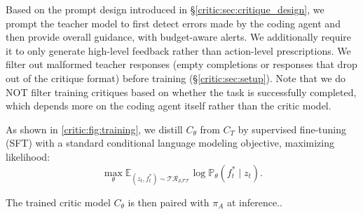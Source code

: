Based on the prompt design introduced in \S\ref{critic:sec:critique_design}, we prompt the teacher model to first detect errors made by the coding agent and then provide overall guidance, with budget-aware alerts. We additionally require it to only generate high-level feedback rather than action-level prescriptions.
We filter out malformed teacher responses (empty completions or responses that drop out of the critique format) before training (\S\ref{critic:sec:setup}).
Note that we do NOT filter training critiques based on whether the task is successfully completed, which depends more on the coding agent itself rather than the critic model.


As shown in \autoref{critic:fig:training}, we distill $C_\theta$ from $C_T$ by supervised fine-tuning (SFT) with a standard conditional language modeling objective, maximizing likelihood:
\begin{equation}
    \max _{\theta} \mathbb{E}_{(z_t, f_t^*) \sim \mathcal{TR_{SFT}}} \log \mathbb{P}_{\theta}(f_t^* \mid z_t).
\label{critic:eq:sft_loss}
\end{equation}

The trained critic model $C_\theta$ is then paired with $\pi_A$ at inference..






